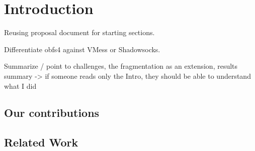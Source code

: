 \chapter{Introduction}\label{ch:intorduction}

Reusing proposal document for starting sections.

Differentiate obfs4 against VMess or Shadowsocks.

Summarize / point to challenges, the fragmentation as an extension, results summary
-> if someone reads only the Intro, they should be able to understand what I did

\section{Our contributions} \label{sec:contributions}

\section{Related Work} \label{sec:related-work}
